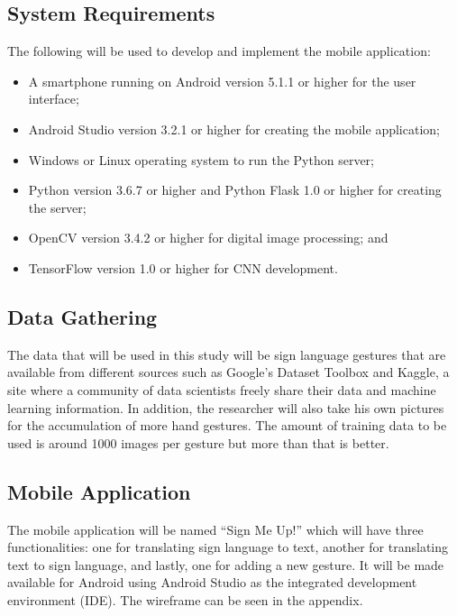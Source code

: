 \documentclass[journal]{./IEEE/IEEEtran}
\begin{document}
\subsection{System Requirements}
The following will be used to develop and implement the mobile application:

\begin{itemize}
    \item A smartphone running on Android version 5.1.1 or higher for the user interface;
    \item Android Studio version 3.2.1 or higher for creating the mobile application;
    \item Windows or Linux operating system to run the Python server;
    \item Python version 3.6.7 or higher and Python Flask 1.0 or higher for creating the server;
    \item OpenCV version 3.4.2 or higher for digital image processing; and
    \item TensorFlow version 1.0 or higher for CNN development.
\end{itemize}

\subsection{Data Gathering}
The data that will be used in this study will be sign language gestures that are available from different sources such as Google's Dataset Toolbox and Kaggle, a site where a community of data scientists freely share their data and machine learning information. In addition, the researcher will also take his own pictures for the accumulation of more hand gestures. The amount of training data to be used is around 1000 images per gesture but more than that is better.

\subsection{Mobile Application}
The mobile application will be named ``Sign Me Up!'' which will have three functionalities: one for translating sign language to text, another for translating text to sign language, and lastly, one for adding a new gesture. It will be made available for Android using Android Studio as the integrated development environment (IDE). The wireframe can be seen in the appendix.
\end{document}
